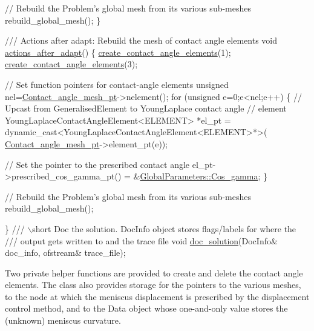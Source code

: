 \begin{DoxyCodeInclude}
   \textcolor{comment}{// Rebuild the Problem's global mesh from its various sub-meshes}
   rebuild\_global\_mesh();
  \}

\textcolor{comment}{}
\textcolor{comment}{ ///  Actions after adapt: Rebuild the mesh of contact angle elements}
\textcolor{comment}{} \textcolor{keywordtype}{void} \hyperlink{classRefineableYoungLaplaceProblem_aa2eab8da1b83091df804ede7c60fac87}{actions\_after\_adapt}()
  \{
   \hyperlink{classRefineableYoungLaplaceProblem_a00d1304e030120e76d9f316dd4053116}{create\_contact\_angle\_elements}(1);
   \hyperlink{classRefineableYoungLaplaceProblem_a00d1304e030120e76d9f316dd4053116}{create\_contact\_angle\_elements}(3);
   
   \textcolor{comment}{// Set function pointers for contact-angle elements}
   \textcolor{keywordtype}{unsigned} nel=\hyperlink{classRefineableYoungLaplaceProblem_a36f5dc0f7071ac15fd63c7c477f77fb0}{Contact\_angle\_mesh\_pt}->nelement();
   \textcolor{keywordflow}{for} (\textcolor{keywordtype}{unsigned} e=0;e<nel;e++)
    \{
     \textcolor{comment}{// Upcast from GeneralisedElement to YoungLaplace contact angle}
     \textcolor{comment}{// element}
     YoungLaplaceContactAngleElement<ELEMENT> *el\_pt = 
      \textcolor{keyword}{dynamic\_cast<}YoungLaplaceContactAngleElement<ELEMENT>*\textcolor{keyword}{>}(
       \hyperlink{classRefineableYoungLaplaceProblem_a36f5dc0f7071ac15fd63c7c477f77fb0}{Contact\_angle\_mesh\_pt}->element\_pt(e));
     
     \textcolor{comment}{// Set the pointer to the prescribed contact angle}
     el\_pt->prescribed\_cos\_gamma\_pt() = &\hyperlink{namespaceGlobalParameters_ae982fcb894e82c683d07d3c2fbbead3d}{GlobalParameters::Cos\_gamma};
    \}
   
   \textcolor{comment}{// Rebuild the Problem's global mesh from its various sub-meshes}
   rebuild\_global\_mesh();
   
  \}
\textcolor{comment}{}
\textcolor{comment}{ /// \(\backslash\)short Doc the solution. DocInfo object stores flags/labels for where the}
\textcolor{comment}{ /// output gets written to and the trace file}
\textcolor{comment}{} \textcolor{keywordtype}{void} \hyperlink{classRefineableYoungLaplaceProblem_a4ec7313c8e4015b0c2af0bbef789e70f}{doc\_solution}(DocInfo& doc\_info, ofstream& trace\_file);

\end{DoxyCodeInclude}


Two private helper functions are provided to create and delete the contact angle elements. The class also provides storage for the pointers to the various meshes, to the node at which the meniscus displacement is prescribed by the displacement control method, and to the {\ttfamily Data} object whose one-\/and-\/only value stores the (unknown) meniscus curvature.


